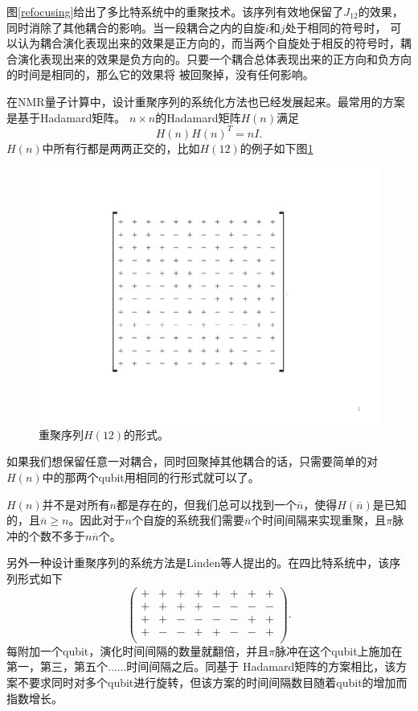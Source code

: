 图\ref{refocusing}给出了多比特系统中的重聚技术。该序列有效地保留了$J_{12}$的效果，同时消除了其他耦合的影响。当一段耦合之内的自旋$i$和$j$处于相同的符号时，
可以认为耦合演化表现出来的效果是正方向的，而当两个自旋处于相反的符号时，耦合演化表现出来的效果是负方向的。只要一个耦合总体表现出来的正方向和负方向的时间是相同的，那么它的效果将
被回聚掉，没有任何影响。

在NMR量子计算中，设计重聚序列的系统化方法也已经发展起来。最常用的方案是基于Hadamard矩阵\cite{refo1,refo2}。
$n\times n$的Hadamard矩阵$H(n)$满足
\begin{equation}\label{aaa}
H(n)H(n)^T = nI.
\end{equation}
$H(n)$中所有行都是两两正交的，比如$H(12)$的例子如下图\ref{hadamard}

\begin{figure}[htbp]
            \begin{center}
              \includegraphics[width= 0.8\columnwidth]{figures/hadamard.pdf}
              \caption{重聚序列$H(12)$的形式。
              }
              \label{hadamard}
            \end{center}
\end{figure}

如果我们想保留任意一对耦合，同时回聚掉其他耦合的话，只需要简单的对$H(n)$中的那两个qubit用相同的行形式就可以了。

$H(n)$并不是对所有$n$都是存在的，但我们总可以找到一个$\overline{n}$，使得$H(\overline{n})$是已知的，且$\overline{n}\geq n$。因此对于$n$个自旋的系统我们需要$\overline{n}$个时间间隔来实现重聚，且$\pi$脉冲的个数不多于$n\overline{n}$个。

另外一种设计重聚序列的系统方法是Linden等人提出的\cite{refo3}。在四比特系统中，该序列形式如下
\begin{equation}\label{aaa}
\left(
  \begin{array}{cccccccc}
    + & + & + & + & +& +& + &+ \\
    + & + & + & + & - & - & - & - \\
    + & + & - & - & - & - & + & + \\
    + & - & - & + & + & - & - & + \\
  \end{array}
\right).
\end{equation}
每附加一个qubit，演化时间间隔的数量就翻倍，并且$\pi$脉冲在这个qubit上施加在第一，第三，第五个......时间间隔之后。同基于
Hadamard矩阵的方案相比，该方案不要求同时对多个qubit进行旋转，但该方案的时间间隔数目随着qubit的增加而指数增长。

